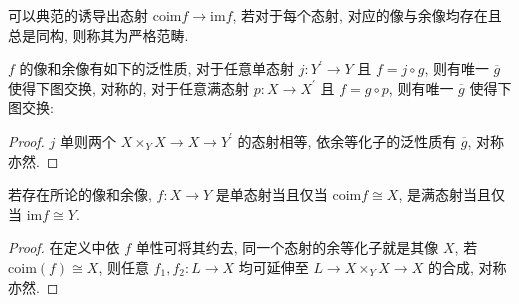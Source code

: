 \begin{definition}
    可以典范的诱导出态射 \(\mathrm{coim} f \to \mathrm{im} f\), 若对于每个态射, 对应的像与余像均存在且总是同构, 则称其为严格范畴.
\end{definition}

\begin{lemma}
    \(f\) 的像和余像有如下的泛性质, 对于任意单态射 \(j : Y^\prime \to Y\) 且 \(f = j \circ g\), 则有唯一 \(\overline{g}\) 使得下图交换,
    对称的, 对于任意满态射 \(p : X \to X^\prime\) 且 \(f = g \circ p\), 则有唯一 \(\overline{g}\) 使得下图交换:

    \begin{center}
         
    \end{center}

    \begin{proof}
        \(j\) 单则两个 \(X \times_Y X \to X \to Y^\prime\) 的态射相等, 依余等化子的泛性质有 \(\overline{g}\), 对称亦然.
    \end{proof}
\end{lemma}

\begin{lemma}
    \label {lemma:mono iff coim is isomorphic to X}
    若存在所论的像和余像, \(f : X \to Y\) 是单态射当且仅当 \(\mathrm{coim} f \cong X\), 是满态射当且仅当 \(\mathrm{im} f \cong Y\).

    \begin{proof}
        在定义中依 \(f\) 单性可将其约去, 同一个态射的余等化子就是其像 \(X\), 若 \(\mathrm{coim} (f) \cong X\), 则任意 \(f_1,f_2 : L \to X\) 均可延伸至 \(L \to X \times_Y X \to X\) 的合成,
        对称亦然.
    \end{proof}
\end{lemma}

